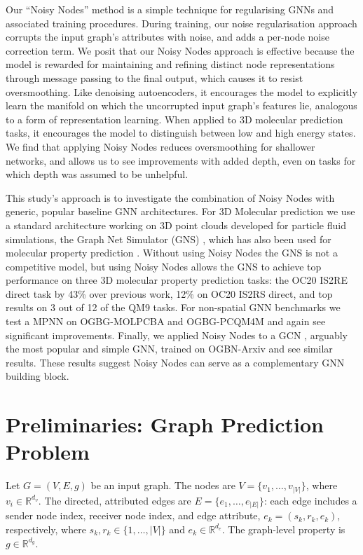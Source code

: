 \documentclass{article} \usepackage{iclr2022_conference,times}
\begin{document}
Our ``Noisy Nodes'' method is a simple technique for regularising GNNs and associated training procedures.
During training, our noise regularisation approach corrupts the input graph's attributes with noise, and adds a per-node noise correction term. We posit that our Noisy Nodes approach is effective because the model is rewarded for maintaining and refining distinct node representations through message passing to the final output, which causes it to resist oversmoothing. Like denoising autoencoders, it encourages the model to explicitly learn the manifold on which the uncorrupted input graph's features lie, analogous to a form of representation learning. When applied to 3D molecular prediction tasks, it encourages the model to distinguish between low and high energy states. We find that applying Noisy Nodes reduces oversmoothing for shallower networks, and allows us to see improvements with added depth, even on tasks for which depth was assumed to be unhelpful.

This study's approach is to investigate the combination of Noisy Nodes with generic, popular baseline GNN architectures. For 3D Molecular prediction we use a standard architecture working on 3D point clouds developed for particle fluid simulations, the Graph Net Simulator (GNS) \citep{pmlr-v119-sanchez-gonzalez20a}, which has also been used for molecular property prediction \citep{Hu2021ForceNetAG}. Without using Noisy Nodes the GNS is not a competitive model, but using Noisy Nodes allows the GNS to achieve top performance on three 3D molecular property prediction tasks: the OC20 IS2RE direct task by 43\% over previous work, 12\% on OC20 IS2RS direct, and top results on 3 out of 12 of the QM9 tasks. For non-spatial GNN benchmarks we test a MPNN \citep{Gilmer2017NeuralMP} on OGBG-MOLPCBA and OGBG-PCQM4M \citep{hu2021ogblsc} and again see significant improvements. Finally, we applied Noisy Nodes to a GCN \citep{Kipf2016GCN}, arguably the most popular and simple GNN, trained on OGBN-Arxiv and see similar results. These results suggest Noisy Nodes can serve as a complementary GNN building block.

\section{Preliminaries: Graph Prediction Problem}

Let $G = (V, E, g)$ be an input graph. The nodes are $V = \{v_1,\dots,v_{|V|}\}$, where $v_i \in \mathbb{R}^{d_v}$. The directed, attributed edges are $E=\{e_1,\dots,e_{|E|}\}$: each edge includes a sender node index, receiver node index, and edge attribute, $e_k = (s_k, r_k, e_k)$, respectively, where $s_k, r_k \in \{1, \dots, |V|\}$ and $e_k \in \mathbb{R}^{d_e}$. The graph-level property is $g \in \mathbb{R}^{d_g}$. 
\end{document}
